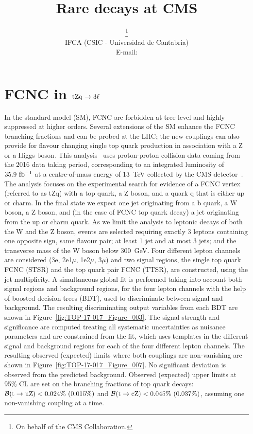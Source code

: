 \documentclass{PoS}
\title{Rare decays at CMS}
\author{\speaker{J\'onatan Piedra}\thanks{On behalf of the CMS Collaboration.}\\
        IFCA (CSIC - Universidad de Cantabria)\\
        E-mail: \email{piedra@cern.ch}}
\begin{document}


\section{FCNC in ${\rm tZq \to 3\ell}$}

In the standard model (SM), FCNC are
forbidden at tree level and highly suppressed at higher orders. Several
extensions of the SM enhance the FCNC branching fractions and can be probed at
the LHC; the new couplings can also provide for flavour changing single top
quark production in association with a Z or a Higgs boson.
This analysis~\cite{top-17-017} uses proton-proton collision data coming from the
2016 data taking period, corresponding to an integrated luminosity of
${\rm 35.9~fb^{-1}}$ at a centre-of-mass energy of 13~TeV collected by the CMS
detector~\cite{cms-detector}. The analysis focuses on the experimental search for evidence of a FCNC
vertex (referred to as tZq) with a top quark, a Z boson, and a quark q that is
either up or charm. In the final state we expect one jet originating from a b quark,
a W boson, a Z boson, and (in the case of FCNC top quark decay) a jet originating
from the up or charm quark. As we limit the analysis to leptonic decays of both the
W and the Z boson, events are selected requiring exactly 3 leptons containing one
opposite sign, same flavour pair; at least 1 jet and at most 3 jets; and the
transverse mass of the W boson below 300~GeV. Four different lepton channels are
considered (3e, 2e1$\mu$, 1e2$\mu$, 3$\mu$) and two signal regions, the single top
quark FCNC (STSR) and the top quark pair FCNC (TTSR), are constructed, using the
jet multiplicity. A simultaneous global fit is performed taking into account
both signal regions and background regions, for the four lepton channels with the
help of boosted decision trees (BDT), used to discriminate between signal and
background. The resulting discriminating output variables from each BDT are
shown in Figure~\ref{fig:TOP-17-017_Figure_003}. The signal strength and significance
are computed treating all systematic uncertainties as nuisance parameters and are
constrained from the fit, which uses templates in the different signal and
background regions for each of the four different lepton channels. The resulting
observed (expected) limits where both couplings are non-vanishing are shown in
Figure~\ref{fig:TOP-17-017_Figure_007}. No significant deviation is observed from
the predicted background. Observed (expected) upper limits at 95\% CL are set on
the branching fractions of top quark decays:
${\cal B}({\rm t \to uZ}) < 0.024\%~(0.015\%)$ and
${\cal B}({\rm t \to cZ}) < 0.045\%~(0.037\%)$, assuming one non-vanishing
coupling at a time.
\end{document}
